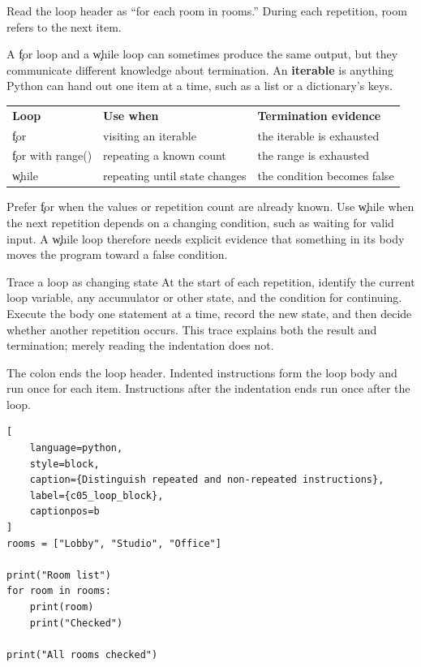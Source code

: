 Read the loop header as ``for each \c{room} in \c{rooms}.'' During each
repetition, \c{room} refers to the next item.


A \c{for} loop and a \c{while} loop can sometimes produce the same output,
but they communicate different knowledge about termination. An
\textbf{iterable} is anything Python can hand out one item at a time, such as
a list or a dictionary's keys.

\begin{center}
\begin{tabular}{lll}
\textbf{Loop} & \textbf{Use when} & \textbf{Termination evidence} \\
\c{for} & visiting an iterable & the iterable is exhausted \\
\c{for} with \c{range()} & repeating a known count & the range is exhausted \\
\c{while} & repeating until state changes & the condition becomes false \\
\end{tabular}
\end{center}

Prefer \c{for} when the values or repetition count are already known. Use
\c{while} when the next repetition depends on a changing condition, such as
waiting for valid input. A \c{while} loop therefore needs explicit evidence
that something in its body moves the program toward a false condition.

\begin{ExplainBox}{Trace a loop as changing state}
At the start of each repetition, identify the current loop variable, any
accumulator or other state, and the condition for continuing. Execute the body
one statement at a time, record the new state, and then decide whether another
repetition occurs. This trace explains both the result and termination; merely
reading the indentation does not.
\end{ExplainBox}


The colon ends the loop header. Indented instructions form the loop body and
run once for each item. Instructions after the indentation ends run once after
the loop.

\begin{lstlisting}[
    language=python,
    style=block,
    caption={Distinguish repeated and non-repeated instructions},
    label={c05_loop_block},
    captionpos=b
]
rooms = ["Lobby", "Studio", "Office"]

print("Room list")
for room in rooms:
    print(room)
    print("Checked")

print("All rooms checked")
\end{lstlisting}

